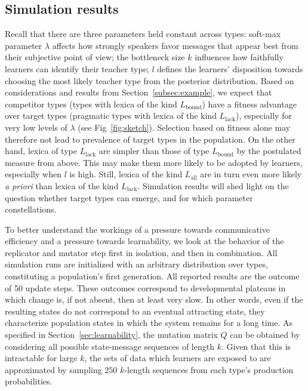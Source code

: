 \documentclass[a4paper, 11pt]{article}
\theoremstyle{Satz}
\newcommand{\mylang}[1]{\ensuremath{L_{\text{#1}}}\xspace} %
\newcommand{\Lall}{\mylang{all}}
\newcommand{\Lbound}{\mylang{bound}}
\newcommand{\Llack}{\mylang{lack}}
\begin{document}
\subsection{Simulation results}
\label{sec:simulation-results}
Recall that there are three parameters held constant across types: soft-max parameter $\lambda$
affects how strongly speakers favor messages that appear best from their subjective point of
view; the bottleneck size $k$ influences how faithfully learners can identify their teacher
type; $l$ defines the learners' disposition towards choosing the most likely teacher type from
the posterior distribution. Based on considerations and results from
Section~\ref{subsec:example}, we expect that competitor types (types with lexica of the kind
$\Lbound$) have a fitness advantage over target types (pragmatic types with lexica of the kind
$\Llack$), especially for very low levels of $\lambda$ (see Fig~\ref{fig:sketch}). Selection
based on fitness alone may therefore not lead to prevalence of target types in the
population. On the other hand, lexica of type $\Llack$ are simpler than those of type $\Lbound$
by the postulated measure from above. This may make them more likely to be adopted by learners,
especially when $l$ is high. Still, lexica of the kind $\Lall$ are in turn even more likely
\emph{a priori} than lexica of the kind $\Llack$. Simulation results will shed light on the
question whether target types can emerge, and for which parameter constellations.

To better understand the workings of a pressure towards communicative efficiency and a pressure
towards learnability, we look at the behavior of the replicator and mutator step first in
isolation, and then in combination. All simulation runs are initialized with an arbitrary
distribution over types, constituting a population's first generation. All reported results are
the outcome of 50 update steps. These outcomes correspond to developmental plateaus in which
change is, if not absent, then at least very slow. In other words, even if the resulting states
do not correspond to an eventual attracting state, they characterize population states in which the system remains for a long time. As specified in Section~\ref{sec:learnability}, the
mutation matrix $Q$ can be obtained by considering all possible state-message sequences of
length $k$. Given that this is intractable for large $k$, the sets of data which learners are
exposed to are approximated by sampling $250$ $k$-length sequences from each type's production
probabilities.
\end{document}
